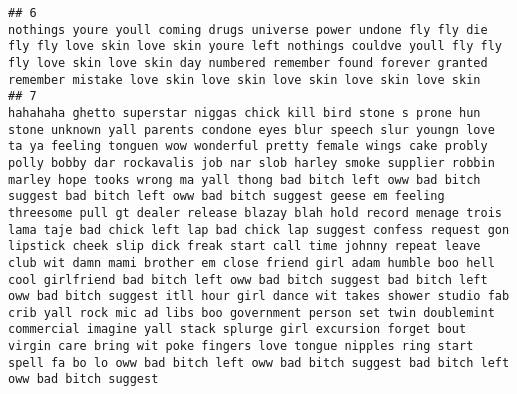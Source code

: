 \documentclass[]{article}
\begin{document}
\begin{verbatim}
## 6                                                                                                                                                                                                                                                                                                                                                                                                                                                                                                                                                                                                                                                                                                                                                                                                                                                                                                                                                         nothings youre youll coming drugs universe power undone fly fly die fly fly love skin love skin youre left nothings couldve youll fly fly fly love skin love skin day numbered remember found forever granted remember mistake love skin love skin love skin love skin love skin
## 7                                                                                   hahahaha ghetto superstar niggas chick kill bird stone s prone hun stone unknown yall parents condone eyes blur speech slur youngn love ta ya feeling tonguen wow wonderful pretty female wings cake probly polly bobby dar rockavalis job nar slob harley smoke supplier robbin marley hope tooks wrong ma yall thong bad bitch left oww bad bitch suggest bad bitch left oww bad bitch suggest geese em feeling threesome pull gt dealer release blazay blah hold record menage trois lama taje bad chick left lap bad chick lap suggest confess request gon lipstick cheek slip dick freak start call time johnny repeat leave club wit damn mami brother em close friend girl adam humble boo hell cool girlfriend bad bitch left oww bad bitch suggest bad bitch left oww bad bitch suggest itll hour girl dance wit takes shower studio fab crib yall rock mic ad libs boo government person set twin doublemint commercial imagine yall stack splurge girl excursion forget bout virgin care bring wit poke fingers love tongue nipples ring start spell fa bo lo oww bad bitch left oww bad bitch suggest bad bitch left oww bad bitch suggest

\end{verbatim}
\end{document}
